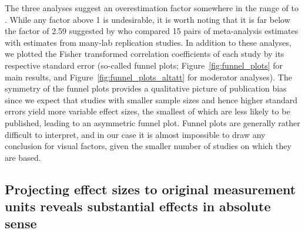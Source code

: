 
The three analyses suggest an overestimation factor somewhere in the range of \unskip to \unskip. While any factor above 1 is undesirable, it is worth noting that it is far below the factor of 2.59 suggested by \cite{kvarven2020} who compared 15 pairs of meta-analysis estimates with estimates from many-lab replication studies. In addition to these analyses, we plotted the Fisher transformed correlation coefficients of each study by its respective standard error (so-called funnel plots; Figure~\ref{fig:funnel_plots} for main results, and Figure~\ref{fig:funnel_plots_altatt} for moderator analyses). The symmetry of the funnel plots provides a qualitative picture of publication bias since we expect that studies with smaller sample sizes and hence higher standard errors yield more variable effect sizes, the smallest of which are less likely to be published, leading to an asymmetric funnel plot. Funnel plots are generally rather difficult to interpret, and in our case it is almost impossible to draw any conclusion for visual factors, given the smaller number of studies on which they are based.




\subsection{Projecting effect sizes to original measurement units reveals substantial effects in absolute sense}

